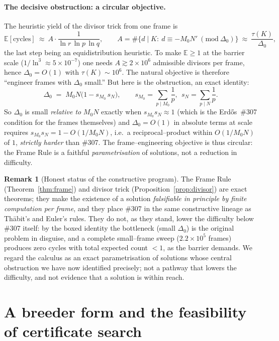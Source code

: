 \documentclass[11pt]{article}
\theoremstyle{definition}
\newtheorem{remark}[theorem]{Remark}
\begin{document}
\paragraph{The decisive obstruction: a circular objective.}
The heuristic yield of the divisor trick from one frame is
\[
\mathbb{E}[\text{cycles}] \ \approx\ A\cdot\frac{1}{\ln r\,\ln p\,\ln q},
\qquad A=\#\{d\mid K:\ d\equiv -M_0N'\ (\mathrm{mod}\ \Delta_0)\}\ \approx\ \frac{\tau(K)}{\Delta_0},
\]
the last step being an equidistribution heuristic. To make $\mathbb{E}\ge1$ at the barrier scale
($1/\ln^3\approx 5\times10^{-7}$) one needs $A\gtrsim 2\times10^6$ admissible divisors per frame,
hence $\Delta_0=O(1)$ with $\tau(K)\sim10^6$. The natural objective is therefore ``engineer frames
with $\Delta_0$ small.'' But here is the obstruction, an exact identity:
\[
\boxed{\ \Delta_0 \;=\; M_0N\bigl(1-s_{M_0}\,s_N\bigr),\qquad
s_{M_0}=\!\!\sum_{p\mid M_0}\!\frac1p,\ \ s_N=\sum_{p\mid N}\frac1p.\ }
\]
So $\Delta_0$ is small \emph{relative to} $M_0N$ exactly when $s_{M_0}s_N\approx1$ (which is the
Erd\H{o}s~\#307 condition for the frames themselves) and $\Delta_0=O(1)$ in absolute terms at
scale requires $s_{M_0}s_N=1-O(1/M_0N)$, i.e.\ a reciprocal--product within $O(1/M_0N)$ of $1$,
\emph{strictly harder} than \#307. The frame--engineering objective is thus circular: the Frame Rule
is a faithful \emph{parametrisation} of solutions, not a reduction in difficulty.

\begin{remark}[Honest status of the constructive program]
The Frame Rule (Theorem~\ref{thm:frame}) and divisor trick (Proposition~\ref{prop:divisor}) are
exact theorems; they make the existence of a solution \emph{falsifiable in principle by finite
computation per frame}, and they place \#307 in the same constructive lineage as Th\=abit's and
Euler's rules. They do not, as they stand, lower the difficulty below \#307 itself: by the boxed
identity the bottleneck (small $\Delta_0$) is the original problem in disguise, and a complete
small--frame sweep ($2.2\times10^5$ frames) produces zero cycles with total expected count $<1$, as
the barrier demands. We regard the calculus as an exact parametrisation of solutions whose central
obstruction we have now identified precisely; not a pathway that lowers the difficulty, and not
evidence that a solution is within reach.
\end{remark}

\section{A breeder form and the feasibility of certificate search}\label{sec:breeder}
\end{document}
